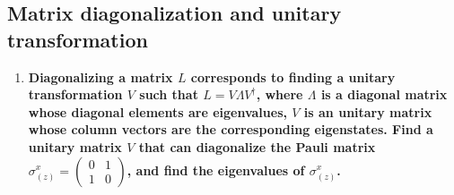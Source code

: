 \documentclass[../../main.tex]{subfiles}
\begin{document}
\subsection{Matrix diagonalization and unitary transformation}
\begin{enumerate}
  \item  \textbf{Diagonalizing a matrix $L$ corresponds to finding a unitary transformation $V$ such that $L=V\Lambda V^{\dagger}$, where $\Lambda$ is a diagonal matrix whose diagonal elements are eigenvalues, $V$ is an unitary matrix whose column vectors are the corresponding eigenstates. Find a unitary matrix $V$ that can diagonalize the Pauli matrix $\sigma^{x}_{(z)} = \begin{pmatrix}
    0 & 1 \\
    1 & 0\end{pmatrix}$, and find the eigenvalues of $\sigma^{x}_{(z)}$.}


\end{enumerate}
\end{document}
